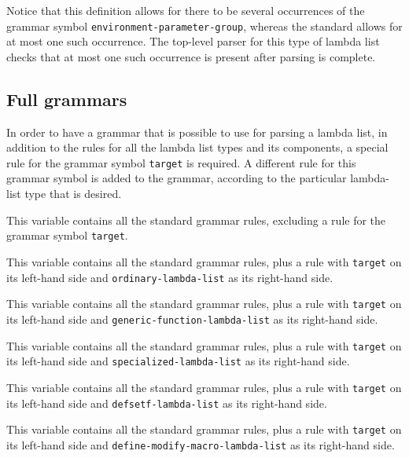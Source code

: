 Notice that this definition allows for there to be several occurrences
of the grammar symbol \texttt{environment-parameter-group}, whereas
the \commonlisp{} standard allows for at most one such occurrence.
The top-level parser for this type of lambda list checks that at most
one such occurrence is present after parsing is complete.

\subsection{Full grammars}

In order to have a grammar that is possible to use for parsing a
lambda list, in addition to the rules for all the lambda list types
and its components, a special rule for the grammar symbol
\texttt{target} is required.  A different rule for this grammar symbol
is added to the grammar, according to the particular lambda-list type
that is desired.


This variable contains all the standard grammar rules, excluding a
rule for the grammar symbol \texttt{target}.


This variable contains all the standard grammar rules, plus a rule
with \texttt{target} on its left-hand side and
\texttt{ordinary-lambda-list} as its right-hand side.


This variable contains all the standard grammar rules, plus a rule
with \texttt{target} on its left-hand side and
\texttt{generic-function-lambda-list} as its right-hand side.


This variable contains all the standard grammar rules, plus a rule
with \texttt{target} on its left-hand side and
\texttt{specialized-lambda-list} as its right-hand side.


This variable contains all the standard grammar rules, plus a rule
with \texttt{target} on its left-hand side and
\texttt{defsetf-lambda-list} as its right-hand side.


This variable contains all the standard grammar rules, plus a rule
with \texttt{target} on its left-hand side and
\texttt{define-modify-macro-lambda-list} as its right-hand side.

